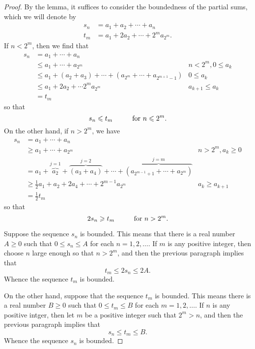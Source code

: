 \documentclass[12pt]{article}
\theoremstyle{definition}
\theoremstyle{theorem}
\begin{document}
\begin{proof}
By the lemma, it suffices to consider the boundedness of the partial sums, which we will denote by 
\begin{align*}
s_n &= a_1 + a_2 + \cdots + a_n \\
t_m &= a_1 + 2a_2 + \cdots + 2^ma_{2^m}.
\end{align*} 
If $n < 2^m$, then we find that 
\begin{align*}
s_n &= a_1 + \cdots + a_{n} \\
&\leqslant a_1 + \cdots + a_{2^m} & n < 2^m, 0 \leqslant a_k\\
&\leqslant a_1 + (a_2 + a_3) + \cdots + (a_{2^m} + \cdots + a_{2^{m+1}-1}) &0 \leqslant a_k \\
&\leqslant a_1 + 2 a_2 + \cdots 2^ma_{2^m} &a_{k+1} \leqslant a_k \\
&= t_m
\end{align*}
so that
\[
s_n \leqslant t_m \hspace{10mm} \text{for $n \leqslant 2^m$}.
\]
On the other hand, if $n > 2^m$, we have 
\begin{align*}
s_n &= a_1 + \cdots + a_n \\
&\geqslant a_1 + \cdots + a_{2^{m}} &n > 2^m, a_k \geqslant 0 \\
&= a_1 + \overbrace{a_2}^{j=1} + \overbrace{(a_3 + a_4)}^{j=2} + \cdots + \overbrace{(a_{2^{m-1}+1} + \cdots + a_{2^m})}^{j=m} & \\
&\geqslant \frac{1}{2}a_1 + a_2 + 2a_4 + \cdots + 2^{m-1}a_{2^m} & a_{k} \geqslant a_{k+1}\\
&= \frac{1}{2} t_{m}
\end{align*}
so that 
\[
2s_n \geqslant t_m \hspace{10mm} \text{for $n > 2^m.$}
\]

Suppose the sequence $s_n$ is bounded. This means that there is a real number $A \geqslant 0$ such that $0 \leqslant s_n \leqslant A$ for each $n=1, 2, \ldots$. If $m$ is any positive integer, then choose $n$ large enough so that $n > 2^m$, and then the previous paragraph implies that 
\[
t_m \leqslant 2s_n \leqslant 2A.
\]
Whence the sequence $t_m$ is bounded. 

On the other hand, suppose that the sequence $t_m$ is bounded. This means there is a real number $B \geqslant 0$ such that $0 \leqslant t_m \leqslant B$ for each $m =1, 2, \ldots$. If $n$ is any positive intger, then let $m$ be a positive integer such that $2^m > n$, and then the previous paragraph implies that 
\[
s_n \leqslant t_m \leqslant B.
\]
Whence the sequence $s_n$ is bounded. 
\end{proof}
\end{document}
